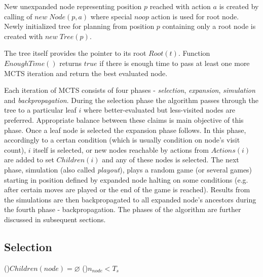 New unexpanded node representing position $p$ reached with action $a$ is created by calling of
$new\;Node(p,a)$ where special $noop$ action is used for root node. Newly initialized tree for
planning from position $p$
containing only a root node is created with $new\;Tree(p)$.

The
tree itself provides the pointer to its root $Root(t)$. Function $EnoughTime()$ returns $true$ if
there is enough time to pass at least one more MCTS iteration and return the best evaluated node.

Each iteration of MCTS consists of four
phases - \emph{selection}, \emph{expansion}, \emph{simulation} and \emph{backpropagation}. During
the selection phase the 
algorithm passes through the tree to a particular leaf $i$ where better-evaluated but less-visited nodes
are preferred. Appropriate balance between these claims is main objective of this
phase. Once a leaf node is selected the expansion phase follows. In this phase, accordingly to a
certan condition (which is usually condition on node's visit count), $i$ itself is selected, or
new nodes reachable by actions from $Actions(i)$ are added to set $Children(i)$ and any of these
nodes is selected.
The next phase, simulation (also called \emph{playout}), plays a random game (or several games) 
starting
in position defined by expanded node halting on some conditions (e.g. after certain moves are
played or the end of the game is reached). Results from the simulations are then backpropagated to all
expanded node's ancestors during the fourth phase - backpropagation. The phases of the algorithm are
further discussed in subsequent sections.




\subsection{Selection}

\begin{algorithm}
\DontPrintSemicolon
\caption{$SelectionStep(node)$\label{alg_selection_step}}
\If(){$Children(node)=\varnothing$}{
}
\If(){$n_{node} < T_s$}{
     
}
 
\end{algorithm}

